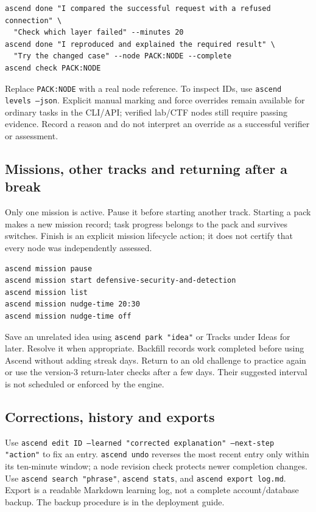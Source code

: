 \begin{verbatim}
ascend done "I compared the successful request with a refused connection" \
  "Check which layer failed" --minutes 20
ascend done "I reproduced and explained the required result" \
  "Try the changed case" --node PACK:NODE --complete
ascend check PACK:NODE
\end{verbatim}
Replace \texttt{PACK:NODE} with a real node reference. To inspect IDs, use
\texttt{ascend levels --json}. Explicit manual marking and force overrides remain
available for ordinary tasks in the CLI/API; verified lab/CTF nodes still require
passing evidence. Record a reason and do not interpret an override as a
successful verifier or assessment.

\subsection{Missions, other tracks and returning after a break}
Only one mission is active. Pause it before starting another track. Starting a
pack makes a new mission record; task progress belongs to the pack and survives
switches. Finish is an explicit mission lifecycle action; it does not certify
that every node was independently assessed.
\begin{verbatim}
ascend mission pause
ascend mission start defensive-security-and-detection
ascend mission list
ascend mission nudge-time 20:30
ascend mission nudge-time off
\end{verbatim}
Save an unrelated idea using \texttt{ascend park "idea"} or Tracks under Ideas for later. Resolve it when
appropriate. Backfill records work completed before using Ascend without adding
streak days. Return to an old challenge to practice again or use the version-3
return-later checks after a few days. Their suggested interval is not scheduled
or enforced by the engine.

\subsection{Corrections, history and exports}
Use \texttt{ascend edit ID --learned "corrected explanation" --next-step "action"}
to fix an entry. \texttt{ascend undo} reverses the most recent entry only within
its ten-minute window; a node revision check protects newer completion changes.
Use \texttt{ascend search "phrase"}, \texttt{ascend stats}, and
\texttt{ascend export log.md}. Export is a readable Markdown learning log, not a
complete account/database backup. The backup procedure is in the deployment guide.


